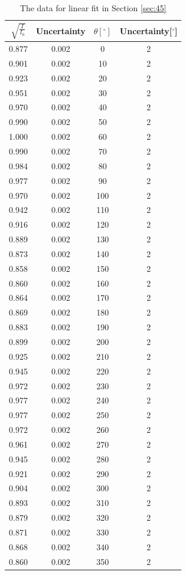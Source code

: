 \documentclass{my_template}
\begin{document}
    \begin{table}[!ht]
        \centering
        \begin{tabular}{|c|c|c|c|}
            \hline
            $\sqrt{\frac{I}{I_0}}$&Uncertainty&$\theta[^\circ]$&Uncertainty[$^\circ$]\\\hline
            0.877&0.002&0&2\\\hline
            0.901&0.002&10&2\\\hline
            0.923&0.002&20&2\\\hline
            0.951&0.002&30&2\\\hline
            0.970&0.002&40&2\\\hline
            0.990&0.002&50&2\\\hline
            1.000&0.002&60&2\\\hline
            0.990&0.002&70&2\\\hline
            0.984&0.002&80&2\\\hline
            0.977&0.002&90&2\\\hline
            0.970&0.002&100&2\\\hline
            0.942&0.002&110&2\\\hline
            0.916&0.002&120&2\\\hline
            0.889&0.002&130&2\\\hline
            0.873&0.002&140&2\\\hline
            0.858&0.002&150&2\\\hline
            0.860&0.002&160&2\\\hline
            0.864&0.002&170&2\\\hline
            0.869&0.002&180&2\\\hline
            0.883&0.002&190&2\\\hline
            0.899&0.002&200&2\\\hline
            0.925&0.002&210&2\\\hline
            0.945&0.002&220&2\\\hline
            0.972&0.002&230&2\\\hline
            0.977&0.002&240&2\\\hline
            0.977&0.002&250&2\\\hline
            0.972&0.002&260&2\\\hline
            0.961&0.002&270&2\\\hline
            0.945&0.002&280&2\\\hline
            0.921&0.002&290&2\\\hline
            0.904&0.002&300&2\\\hline
            0.893&0.002&310&2\\\hline
            0.879&0.002&320&2\\\hline
            0.871&0.002&330&2\\\hline
            0.868&0.002&340&2\\\hline
            0.860&0.002&350&2\\\hline
        \end{tabular}
        \caption{The data for linear fit in Section \ref{sec:45}}
        \label{tab:linearfitof45}
    \end{table}
\end{document}
